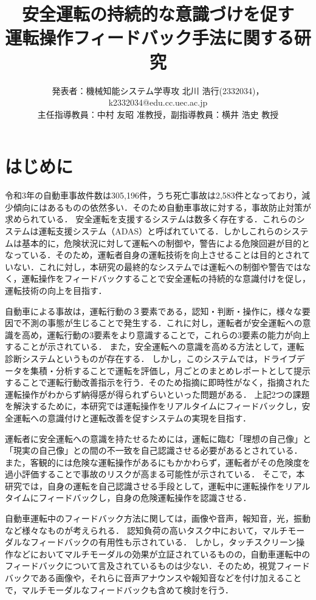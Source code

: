 \documentclass[twocolumn,a4j]{jarticle}
\title{安全運転の持続的な意識づけを促す\\運転操作フィードバック手法に関する研究}
\author{発表者：機械知能システム学専攻 北川 浩行(2332034)，k2332034@edu.cc.uec.ac.jp\\
主任指導教員：中村 友昭 准教授，副指導教員：横井 浩史 教授} %
\date{}
\begin{document}
\maketitle





\section{はじめに}
令和3年の自動車事故件数は305,196件，うち死亡事故は2,583件となっており，減少傾向にはあるものの依然多い．そのため自動車事故に対する，事故防止対策が求められている．
安全運転を支援するシステムは数多く存在する．これらのシステムは運転支援システム（ADAS）と呼ばれていてる．しかしこれらのシステムは基本的に，危険状況に対して運転への制御や，警告による危険回避が目的となっている．そのため，運転者自身の運転技術を向上させることは目的とされていない．これに対し，本研究の最終的なシステムでは運転への制御や警告ではなく，運転操作をフィードバックすることで安全運転の持続的な意識付けを促し，運転技術の向上を目指す．

自動車による事故は，運転行動の３要素である，認知・判断・操作に，様々な要因で不測の事態が生じることで発生する．これに対し，運転者が安全運転への意識を高め，運転行動の3要素をより意識することで，これらの3要素の能力が向上することが示されている．%
また，安全運転への意識を高める方法として，運転診断システムというものが存在する．%
しかし，このシステムでは，ドライブデータを集積・分析することで運転を評価し，月ごとのまとめレポートとして提示することで運転行動改善指示を行う．そのため指摘に即時性がなく，指摘された運転操作がわからず納得感が得られずらいといった問題がある．
上記2つの課題を解決するために，本研究では運転操作をリアルタイムにフィードバックし，安全運転への意識付けと運転改善を促すシステムの実現を目指す．

運転者に安全運転への意識を持たせるためには，運転に臨む「理想の自己像」と「現実の自己像」との間の不一致を自己認識させる必要があるとされている．%
また，客観的には危険な運転操作があるにもかかわらず，運転者がその危険度を過小評価することで事故のリスクが高まる可能性が示されている．%
そこで，本研究では，自身の運転を自己認識させる手段として，運転中に運転操作をリアルタイムにフィードバックし，自身の危険運転操作を認識させる．

自動車運転中のフィードバック方法に関しては，画像や音声，報知音，光，振動など様々なものが考えられる．
認知負荷の高いタスク中において，マルチモーダルなフィードバックの有用性も示されている．%
しかし，タッチスクリーン操作などにおいてマルチモーダルの効果が立証されているものの，自動車運転中のフィードバックについて言及されているものは少ない．そのため，視覚フィードバックである画像や，それらに音声アナウンスや報知音などを付け加えることで，マルチモーダルなフィードバックも含めて検討を行う．
\end{document}
